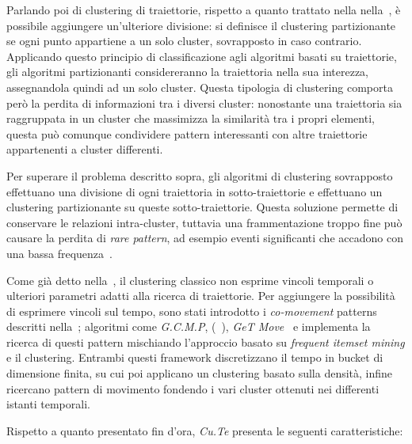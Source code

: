 Parlando poi di clustering di traiettorie, rispetto a quanto trattato nella nella~, è possibile aggiungere un'ulteriore divisione:
si definisce il clustering partizionante se ogni punto appartiene a un solo cluster, sovrapposto in caso contrario.
Applicando questo principio di classificazione agli algoritmi basati su traiettorie, gli algoritmi partizionanti considereranno la traiettoria nella sua interezza,
assegnandola quindi ad un solo cluster. Questa tipologia di clustering comporta però la perdita di informazioni tra i diversi cluster:
nonostante una traiettoria sia raggruppata in un cluster che massimizza la similarità tra i propri elementi,
questa può comunque condividere pattern interessanti con altre traiettorie appartenenti a cluster differenti.

Per superare il problema descritto sopra, gli algoritmi di clustering sovrapposto effettuano una divisione di ogni traiettoria
in sotto-traiettorie e effettuano un clustering partizionante su queste sotto-traiettorie.
Questa soluzione permette di conservare le relazioni intra-cluster, tuttavia una frammentazione troppo fine può causare
la perdita di \textit{rare pattern}, ad esempio eventi significanti che accadono con una bassa frequenza~\cite{DBLP:journals/tkdd/KohR16, DBLP:journals/geoinformatica/HuangPX06}.

Come già detto nella~, il clustering classico non esprime vincoli temporali o ulteriori parametri adatti alla ricerca di traiettorie.
Per aggiungere la possibilità di esprimere vincoli sul tempo, sono stati introdotto i \textit{co-movement} patterns descritti nella~; algoritmi come \textit{G.C.M.P},
(~), \textit{GeT Move}~\cite{DBLP:journals/ijitdm/PhanPT16} e  implementa la ricerca di questi pattern mischiando l'approccio basato su \textit{frequent itemset mining} e il clustering.
Entrambi questi framework discretizzano il tempo in bucket di dimensione finita, su cui poi applicano un clustering basato sulla densità, infine
ricercano pattern di movimento fondendo i vari cluster ottenuti nei differenti istanti temporali.

Rispetto a quanto presentato fin d'ora, \textit{Cu.Te} presenta le seguenti caratteristiche:

